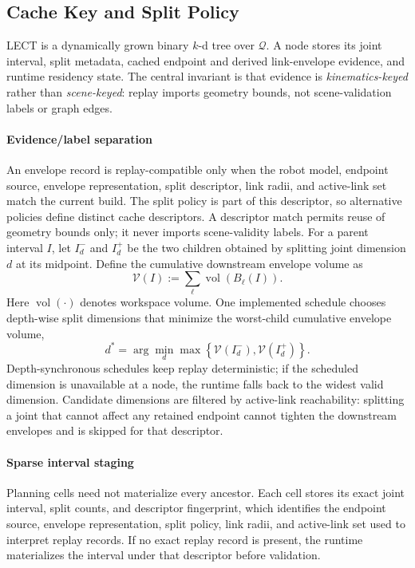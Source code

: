 \documentclass[journal]{IEEEtran}
\newcommand{\Q}{\ensuremath{\mathcal{Q}}}
\begin{document}
\subsection{Cache Key and Split Policy}\label{sec:lect_design}

LECT is a dynamically grown binary \(k\)-d tree over $\Q$. A node
stores its joint interval, split metadata, cached endpoint and derived
link-envelope evidence, and runtime residency state. The central invariant is
that evidence is
\emph{kinematics-keyed} rather than \emph{scene-keyed}: replay imports geometry
bounds, not scene-validation labels or graph edges.

\paragraph{Evidence/label separation}
An envelope record is replay-compatible only when the robot model, endpoint
source, envelope representation, split descriptor, link radii, and active-link
set match the current build. The split policy is part of this descriptor, so
alternative policies define distinct cache descriptors. A descriptor match permits
reuse of geometry bounds only; it never imports scene-validity labels. For a
parent interval $I$, let
$I_d^{-}$ and $I_d^{+}$ be the two children
obtained by splitting joint dimension $d$ at its midpoint. Define the cumulative
downstream envelope volume as
\[
\mathcal{V}(I) := \sum_{\ell} \operatorname{vol}(B_\ell(I)).
\]
Here \(\operatorname{vol}(\cdot)\) denotes workspace volume.
One implemented schedule chooses depth-wise split dimensions that minimize the
worst-child cumulative envelope volume,
\[
d^* = \arg\min_d
\max\!\left\{\mathcal{V}(I_d^-),\mathcal{V}(I_d^+)\right\}.
\]
Depth-synchronous schedules keep replay deterministic; if the scheduled
dimension is unavailable at a node, the runtime falls back to the widest valid
dimension. Candidate dimensions are filtered by active-link reachability:
splitting a joint that cannot affect any retained endpoint cannot tighten the
downstream envelopes and is skipped for that descriptor.

\paragraph{Sparse interval staging}
Planning cells need not materialize every ancestor. Each cell stores its exact
joint interval, split counts, and descriptor fingerprint, which identifies the
endpoint source, envelope representation, split policy, link radii, and
active-link set used to interpret replay records. If no exact replay record is
present, the runtime materializes the interval under that descriptor before
validation.
\end{document}
